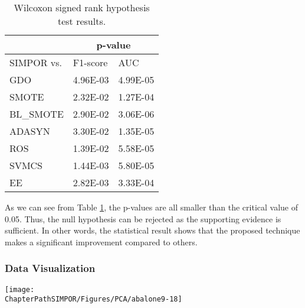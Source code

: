 \begin{table}[htbp]
	\centering
	\caption{Wilcoxon signed rank hypothesis test results.}
	
	\begin{tabular}{lcc}
		\toprule
		& \multicolumn{2}{c}{p-value} \\
		\midrule
		SIMPOR vs. & \multicolumn{1}{l|}{F1-score} & \multicolumn{1}{l}{AUC} \\
		\midrule
		GDO   & 4.96E-03 & 4.99E-05 \\
		SMOTE & 2.32E-02 & 1.27E-04 \\
		BL\_SMOTE & 2.90E-02 & 3.06E-06 \\
		ADASYN & 3.30E-02 & 1.35E-05 \\
		ROS   & 1.39E-02 & 5.58E-05 \\
		SVMCS & 1.44E-03 & 5.80E-05 \\
		EE    & 2.82E-03 & 3.33E-04 \\
		\bottomrule
	\end{tabular}%
	
	
	\label{tab:wilcoxonTest}%
\end{table}%


As we can see from Table \ref{tab:wilcoxonTest}, the p-values are all smaller than the critical value of 0.05. Thus, the null hypothesis can be rejected as the supporting evidence is sufficient. In other words, the statistical result shows that the proposed technique makes a significant improvement compared to others.     




\subsubsection{Data Visualization}  

\begin{figure*}[h!]
	\centering
	\texttt{[image: \\ChapterPathSIMPOR/Figures/PCA/abalone9-18]}
	\caption[Data visualization over methods.]{Abalone9-18: Generated training data projected onto 2-dimension space and their histograms in 1-Dimension space using Principle Component Analysis dimension reduction technique. The bottom tables illustrate the number of samples in two classes, 1-Dimension histogram intersection between 2 classes, and the hard-to-differentiate ratio between the number of intersectional samples to the number of minority samples ($HDR = \frac{Inter.}{Minority}100\%$).}
	\label{fig:visualization1d2d}
\end{figure*}

